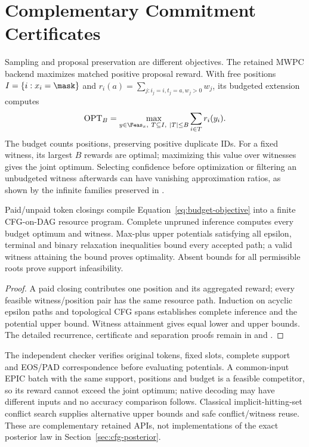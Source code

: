 \section{Complementary Commitment Certificates}
\label{sec:budgeted}

Sampling and proposal preservation are different objectives. The retained MWPC
backend maximizes matched positive proposal reward. With free positions
$I=\{i:x_i=\mask\}$ and $r_i(a)=\sum_{j:i_j=i,t_j=a,w_j>0}w_j$, its budgeted
extension computes
\begin{equation}
 \operatorname{OPT}_B=\max_{y\in\Feas_x,\ T\subseteq I,\ |T|\leq B}
 \sum_{i\in T}r_i(y_i).
 \label{eq:budget-objective}
\end{equation}
The budget counts positions, preserving positive duplicate IDs. For a fixed
witness, its largest $B$ rewards are optimal; maximizing this value over witnesses
gives the joint optimum. Selecting confidence before optimization or filtering
an unbudgeted witness afterwards can have vanishing approximation ratios, as
shown by the infinite families preserved in .

\begin{theorem}
Paid/unpaid token closings compile Equation~\ref{eq:budget-objective} into a
finite CFG-on-DAG resource program. Complete unpruned inference computes every
budget optimum and witness. Max-plus upper potentials satisfying all epsilon,
terminal and binary relaxation inequalities bound every accepted path; a valid
witness attaining the bound proves optimality. Absent bounds for all permissible
roots prove support infeasibility.
\label{thm:budget-certificate}
\end{theorem}
\begin{proof}
A paid closing contributes one position and its aggregated reward; every
feasible witness/position pair has the same resource path. Induction on
acyclic epsilon paths and topological CFG spans establishes complete inference
and the potential upper bound. Witness attainment gives equal lower and upper
bounds. The detailed recurrence, certificate and separation proofs remain in
 and .
\end{proof}

The independent checker verifies original tokens, fixed slots, complete support
and EOS/PAD correspondence before evaluating potentials. A common-input EPIC
batch with the same support, positions and budget is a feasible competitor, so
its reward cannot exceed the joint optimum; native decoding may have different
inputs and no accuracy comparison follows. Classical implicit-hitting-set
conflict search \cite{davies2011maxhs,saikko2016lmhs} supplies alternative upper
bounds and safe conflict/witness reuse. These are complementary retained APIs,
not implementations of the exact posterior law in Section~\ref{sec:cfg-posterior}.
